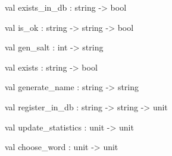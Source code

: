 \documentclass[11pt]{article}
\begin{document}
\label{val:Server.exists-underscorein-underscoredb}\begin{ocamldoccode}
val exists_in_db : string -> bool
\end{ocamldoccode}




\label{val:Server.is-underscoreok}\begin{ocamldoccode}
val is_ok : string -> string -> bool
\end{ocamldoccode}




\label{val:Server.gen-underscoresalt}\begin{ocamldoccode}
val gen_salt : int -> string
\end{ocamldoccode}




\label{val:Server.exists}\begin{ocamldoccode}
val exists : string -> bool
\end{ocamldoccode}




\label{val:Server.generate-underscorename}\begin{ocamldoccode}
val generate_name : string -> string
\end{ocamldoccode}




\label{val:Server.register-underscorein-underscoredb}\begin{ocamldoccode}
val register_in_db : string -> string -> unit
\end{ocamldoccode}




\label{val:Server.update-underscorestatistics}\begin{ocamldoccode}
val update_statistics : unit -> unit
\end{ocamldoccode}




\label{val:Server.choose-underscoreword}\begin{ocamldoccode}
val choose_word : unit -> unit
\end{ocamldoccode}
\end{document}
